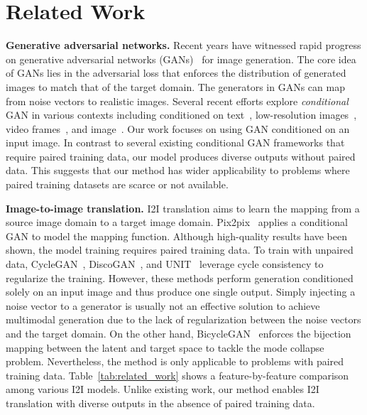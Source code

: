 \documentclass[runningheads]{llncs}
\newlength\paramargin
\newlength\secmargin
\newcommand{\Paragraph}[1]
{\vspace{2mm} \noindent \textbf{#1}}
\begin{document}
\section{Related Work}
\label{sec:related}
\vspace{-1mm}
\vspace{\secmargin}
\Paragraph{Generative adversarial networks.}
Recent years have witnessed rapid progress on generative adversarial networks (GANs)~\cite{goodfellow2014GAN,radford2016dcgan,arjovsky2017wgan} for image generation.
The core idea of GANs lies in the adversarial loss that enforces the distribution of generated images to match that of the target domain.
The generators in GANs can map from noise vectors to realistic images.
Several recent efforts explore \emph{conditional} GAN in various contexts including conditioned on text~\cite{reed2016text2img}, low-resolution images~\cite{ledig2016photo}, video frames~\cite{vondrick2016videogan}, and image~\cite{isola2017pix2pix}.
Our work focuses on using GAN conditioned on an input image.
In contrast to several existing conditional GAN frameworks that require paired training data, our model produces diverse outputs without paired data.
This suggests that our method has wider applicability to problems where paired training datasets are scarce or not available.

\vspace{\paramargin}
\Paragraph{Image-to-image translation.}
I2I translation aims to learn the mapping from a source image domain to a target image domain.
Pix2pix~\cite{isola2017pix2pix} applies a conditional GAN to model the mapping function.
Although high-quality results have been shown, the model training requires paired training data. 
To train with unpaired data, CycleGAN~\cite{zhu2017cyclegan}, DiscoGAN~\cite{kim2017discogan}, and UNIT~\cite{liu2017unit} leverage cycle consistency to regularize the training.
However, these methods perform generation conditioned solely on an input image and thus produce one single output.
Simply injecting a noise vector to a generator is usually not an effective solution to achieve multimodal generation due to the lack of regularization between the noise vectors and the target domain. 
On the other hand, BicycleGAN~\cite{zhu2017bicyclegan} enforces the bijection mapping between the latent and target space to tackle the mode collapse problem.
Nevertheless, the method is only applicable to problems with paired training data. 
Table~\ref{tab:related_work} shows a feature-by-feature comparison among various I2I models. 
Unlike existing work, our method enables I2I translation with diverse outputs in the absence of paired training data.
\end{document}
